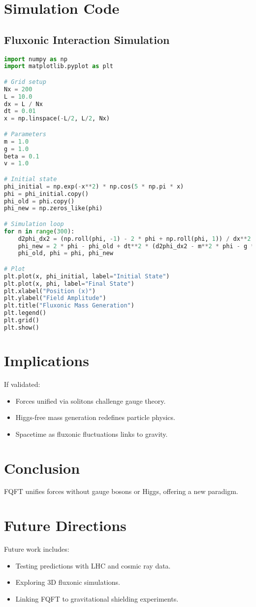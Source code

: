 \documentclass{article}
\begin{document}
\section{Simulation Code}
\subsection{Fluxonic Interaction Simulation}
\begin{lstlisting}[language=Python, caption=Fluxonic Mass Generation Simulation, label=lst:mass]
import numpy as np
import matplotlib.pyplot as plt

# Grid setup
Nx = 200
L = 10.0
dx = L / Nx
dt = 0.01
x = np.linspace(-L/2, L/2, Nx)

# Parameters
m = 1.0
g = 1.0
beta = 0.1
v = 1.0

# Initial state
phi_initial = np.exp(-x**2) * np.cos(5 * np.pi * x)
phi = phi_initial.copy()
phi_old = phi.copy()
phi_new = np.zeros_like(phi)

# Simulation loop
for n in range(300):
    d2phi_dx2 = (np.roll(phi, -1) - 2 * phi + np.roll(phi, 1)) / dx**2  # Periodic boundaries
    phi_new = 2 * phi - phi_old + dt**2 * (d2phi_dx2 - m**2 * phi - g * phi**3 + beta * (phi**2 - v**2) * phi)
    phi_old, phi = phi, phi_new

# Plot
plt.plot(x, phi_initial, label="Initial State")
plt.plot(x, phi, label="Final State")
plt.xlabel("Position (x)")
plt.ylabel("Field Amplitude")
plt.title("Fluxonic Mass Generation")
plt.legend()
plt.grid()
plt.show()
\end{lstlisting}

\section{Implications}
If validated:
\begin{itemize}
    \item Forces unified via solitons challenge gauge theory.
    \item Higgs-free mass generation redefines particle physics.
    \item Spacetime as fluxonic fluctuations links to gravity.
\end{itemize}

\section{Conclusion}
FQFT unifies forces without gauge bosons or Higgs, offering a new paradigm.

\section{Future Directions}
Future work includes:
\begin{itemize}
    \item Testing predictions with LHC and cosmic ray data.
    \item Exploring 3D fluxonic simulations.
    \item Linking FQFT to gravitational shielding experiments.
\end{itemize}
\end{document}
